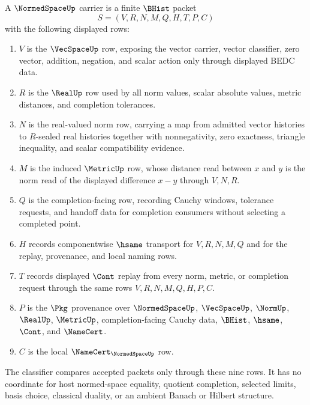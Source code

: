 \begin{definition}
\label{def:normed-space-carrier}
A $\NormedSpaceUp$ carrier is a finite $\BHist$ packet
$$
S=(V,R,N,M,Q,H,T,P,C)
$$
with the following displayed rows:
\begin{enumerate}
\item $V$ is the $\VecSpaceUp$ row, exposing the vector carrier, vector classifier, zero vector, addition, negation, and scalar action only through displayed BEDC data.
\item $R$ is the $\RealUp$ row used by all norm values, scalar absolute values, metric distances, and completion tolerances.
\item $N$ is the real-valued norm row, carrying a map from admitted vector histories to $R$-sealed real histories together with nonnegativity, zero exactness, triangle inequality, and scalar compatibility evidence.
\item $M$ is the induced $\MetricUp$ row, whose distance read between $x$ and $y$ is the norm read of the displayed difference $x-y$ through $V,N,R$.
\item $Q$ is the completion-facing row, recording Cauchy windows, tolerance requests, and handoff data for completion consumers without selecting a completed point.
\item $H$ records componentwise $\hsame$ transport for $V,R,N,M,Q$ and for the replay, provenance, and local naming rows.
\item $T$ records displayed $\Cont$ replay from every norm, metric, or completion request through the same rows $V,R,N,M,Q,H,P,C$.
\item $P$ is the $\Pkg$ provenance over $\NormedSpaceUp$, $\VecSpaceUp$, $\NormUp$, $\RealUp$, $\MetricUp$, completion-facing Cauchy data, $\BHist$, $\hsame$, $\Cont$, and $\NameCert$.
\item $C$ is the local $\NameCert_{\NormedSpaceUp}$ row.
\end{enumerate}
The classifier compares accepted packets only through these nine rows. It has no coordinate for host normed-space equality, quotient completion, selected limits, basis choice, classical duality, or an ambient Banach or Hilbert structure.
\end{definition}

